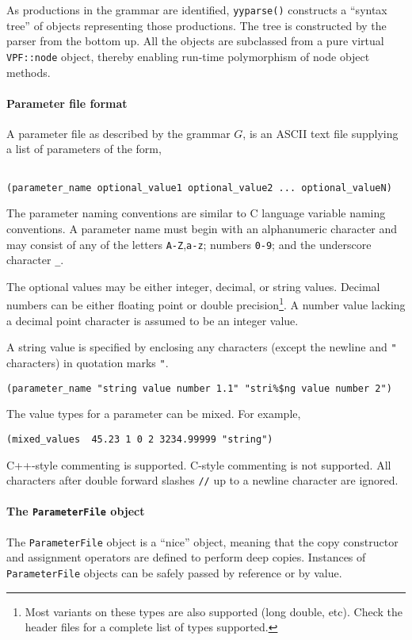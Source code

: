\documentclass{article}
\newcommand{\code}[1]{\texttt{#1}}
\begin{document}
As productions in the grammar are identified, \code{yyparse()} constructs
a ``syntax tree'' of objects representing those productions. The tree is 
constructed by the parser from the bottom up.  All the objects are
subclassed from a pure virtual \code{VPF::node} object, thereby enabling
run-time polymorphism of node object methods.

\paragraph{Parameter file format}
A parameter file as described by the grammar $G$, is an ASCII text file 
supplying a list of parameters of the form,
\begin{verbatim}

(parameter_name optional_value1 optional_value2 ... optional_valueN)

\end{verbatim}

The parameter naming conventions are similar to C language variable naming
conventions.  A parameter name must begin with an alphanumeric character and
may consist of any of the letters \code{A-Z},\code{a-z}; numbers \code{0-9}; 
and the underscore character \code{\_}.

The optional values may be either integer, decimal, or string values.  Decimal
numbers can be either floating point or  double precision\footnote{Most variants
on these types are also supported (long double, etc).  Check the header files
for a complete list of types supported.}.  A number value lacking a decimal point 
character is assumed to be an integer value.

A string value is specified by enclosing any characters (except the newline and
\code{"} characters) in quotation marks \code{"}.
\begin{verbatim}
(parameter_name "string value number 1.1" "stri%$ng value number 2")
\end{verbatim}

The value types for a parameter can be mixed.  For example,
\begin{verbatim}
(mixed_values  45.23 1 0 2 3234.99999 "string")
\end{verbatim}

C++-style commenting is supported.  C-style commenting is not supported.  All
characters after double forward slashes \code{//} up to a newline character are
ignored.

\paragraph{The \code{ParameterFile} object}
The \code{ParameterFile} object is a ``nice'' object, meaning that the copy
constructor and assignment operators are defined to perform deep copies.
Instances of \code{ParameterFile} objects can be safely passed by reference 
or by value.
\end{document}
